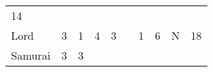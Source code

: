 \documentclass[12pt]{article}
\begin{document}
\begin{longtable}[]{@{}llllllllll@{}}
\begin{minipage}[t]{0.08\columnwidth}\raggedright\strut
14
\strut\end{minipage}\tabularnewline
\begin{minipage}[t]{0.13\columnwidth}\raggedright\strut
Lord
\strut\end{minipage} &
\begin{minipage}[t]{0.06\columnwidth}\raggedright\strut
3
\strut\end{minipage} &
\begin{minipage}[t]{0.06\columnwidth}\raggedright\strut
1
\strut\end{minipage} &
\begin{minipage}[t]{0.06\columnwidth}\raggedright\strut
4
\strut\end{minipage} &
\begin{minipage}[t]{0.06\columnwidth}\raggedright\strut
3
\strut\end{minipage} &
\begin{minipage}[t]{0.06\columnwidth}\raggedright\strut
\strut\end{minipage} &
\begin{minipage}[t]{0.06\columnwidth}\raggedright\strut
1
\strut\end{minipage} &
\begin{minipage}[t]{0.06\columnwidth}\raggedright\strut
6
\strut\end{minipage} &
\begin{minipage}[t]{0.07\columnwidth}\raggedright\strut
N
\strut\end{minipage} &
\begin{minipage}[t]{0.08\columnwidth}\raggedright\strut
18
\strut\end{minipage}\tabularnewline
\begin{minipage}[t]{0.13\columnwidth}\raggedright\strut
Samurai
\strut\end{minipage} &
\begin{minipage}[t]{0.06\columnwidth}\raggedright\strut
3
\strut\end{minipage} &
\begin{minipage}[t]{0.06\columnwidth}\raggedright\strut
3
\strut\end{minipage} &
\begin{minipage}[t]{0.06\columnwidth}\raggedright\strut
\strut\end{minipage} &
\begin{minipage}[t]{0.06\columnwidth}\raggedright\strut
\strut\end{minipage} &

\end{longtable}
\end{document}
